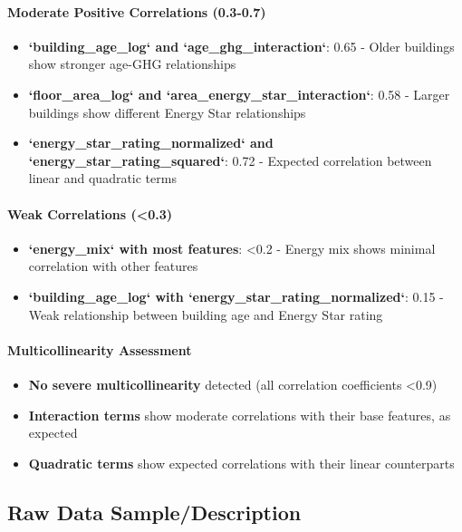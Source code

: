 \paragraph{Moderate Positive Correlations (0.3-0.7)}
\begin{itemize}
    \item \textbf{`building\_age\_log` and `age\_ghg\_interaction`}: 0.65 - Older buildings show stronger age-GHG relationships
    \item \textbf{`floor\_area\_log` and `area\_energy\_star\_interaction`}: 0.58 - Larger buildings show different Energy Star relationships
    \item \textbf{`energy\_star\_rating\_normalized` and `energy\_star\_rating\_squared`}: 0.72 - Expected correlation between linear and quadratic terms
\end{itemize}

\paragraph{Weak Correlations (<0.3)}
\begin{itemize}
    \item \textbf{`energy\_mix` with most features}: <0.2 - Energy mix shows minimal correlation with other features
    \item \textbf{`building\_age\_log` with `energy\_star\_rating\_normalized`}: 0.15 - Weak relationship between building age and Energy Star rating
\end{itemize}

\paragraph{Multicollinearity Assessment}
\begin{itemize}
    \item \textbf{No severe multicollinearity} detected (all correlation coefficients <0.9)
    \item \textbf{Interaction terms} show moderate correlations with their base features, as expected
    \item \textbf{Quadratic terms} show expected correlations with their linear counterparts
\end{itemize}

\subsection{Raw Data Sample/Description}

